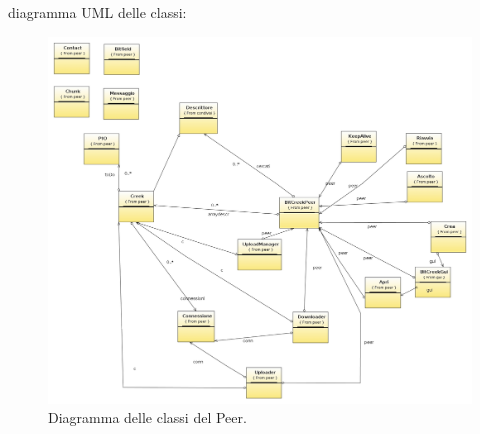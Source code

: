 diagramma UML delle classi:

\begin{figure}[h]
  \centerline{
    \mbox{\includegraphics[scale=0.35]{images/peerClass.jpg}}
  }
  \caption{Diagramma delle classi del Peer.}
  \label{overView}
\end{figure}

